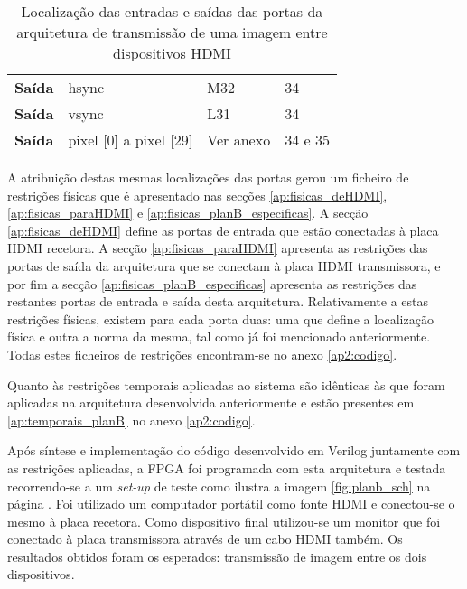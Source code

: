 \begin{table}[h!]
\begin{tabular}{rlll}
			\multicolumn{1}{r|}{\textbf{Saída}}   & hsync                                 & M32                                      & 34                                         \\
			\multicolumn{1}{r|}{\textbf{Saída}}   & vsync                                 & L31                                      & 34                                         \\
			\multicolumn{1}{r|}{\textbf{Saída}}   & pixel {[}0{]} a pixel {[}29{]}        & Ver anexo                                & 34 e 35                                    \\ \hline
		\end{tabular}%
	\captionsetup{width=0.80\linewidth}
	\caption{Localização das entradas e saídas das portas da arquitetura de transmissão de uma imagem entre dispositivos HDMI}
	\label{table:LOCplanB_simples}
\end{table}



A atribuição destas mesmas localizações das portas gerou um ficheiro de restrições físicas que é apresentado nas secções \ref{ap:fisicas_deHDMI}, \ref{ap:fisicas_paraHDMI} e \ref{ap:fisicas_planB_especificas}. A secção \ref{ap:fisicas_deHDMI} define as portas de entrada que estão conectadas à placa HDMI recetora. A secção \ref{ap:fisicas_paraHDMI} apresenta as restrições das portas de saída da arquitetura que se conectam à placa HDMI transmissora, e por fim a secção \ref{ap:fisicas_planB_especificas} apresenta as restrições das restantes portas de entrada e saída desta arquitetura. Relativamente a estas restrições físicas, existem para cada porta duas: uma que define a localização física e outra a norma da mesma, tal como já foi mencionado anteriormente. Todas estes ficheiros de restrições encontram-se no anexo \ref{ap2:codigo}.

Quanto às restrições temporais aplicadas ao sistema são idênticas às que foram aplicadas na arquitetura desenvolvida anteriormente e estão presentes em \ref{ap:temporais_planB} no anexo \ref{ap2:codigo}.

Após síntese e implementação do código desenvolvido em Verilog juntamente com as restrições aplicadas, a FPGA foi programada com esta arquitetura e testada recorrendo-se a um \textit{set-up} de teste como ilustra a imagem \ref{fig:planb_sch} na página \pageref{fig:planb_sch}. Foi utilizado um computador portátil como fonte HDMI e conectou-se o mesmo à placa recetora. Como dispositivo final utilizou-se um monitor que foi conectado à placa transmissora através de um cabo HDMI também. Os resultados obtidos foram os esperados: transmissão de imagem entre os dois dispositivos.

